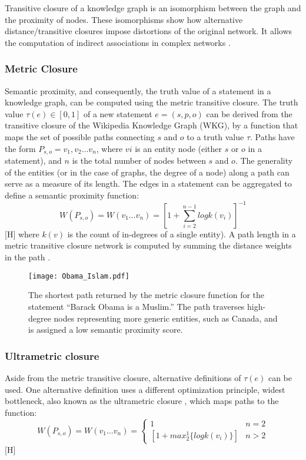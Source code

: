 \documentclass[10pt,11pt,12pt,oneside]{book}
\begin{document}
	Transitive closure of a knowledge graph is an isomorphism between the graph and the proximity of nodes. These isomorphisms show how alternative distance/transitive closures impose distortions of the original network. It allows the computation of indirect associations in complex networks \cite{SIMAS2015}.
	
	\subsubsection{Metric Closure}
	Semantic proximity, and consequently, the truth value of a statement in a knowledge graph, can be computed using the metric transitive closure. The truth value $\tau(e) \in [0, 1]$ of a new statement $e = (s, p, o)$ can be derived from the transitive closure of the Wikipedia Knowledge Graph (WKG), by a function that maps the set of possible paths connecting $s$ and $o$ to a truth value $\tau$. Paths have the form $P_{s,o} = v_{1}, v_{2}\ldots v_{n}$, where $vi$  is an entity node (either $s$ or $o$ in a statement), and $n$ is the total number of nodes between $s$ and $o$. The generality of the entities (or in the case of graphs, the degree of a node) along a path can serve as a measure of its length. The edges in a statement can be aggregated to define a semantic proximity function:
	$$
	W(P_{s,o}) = W(v_{1}\ldots v_{n}) = {[1 +  \sum_{i=2}^{n-1} log k(v_{i})]}^{-1}
	$$[H]
	where $k(v)$ is the count of in-degrees of a single entity). A path length in a metric transitive closure network is computed by summing the distance weights in the path \cite{SIMAS2015}.
	
	\begin{figure}[H]
		\begin{center}
			\texttt{[image: Obama\_Islam.pdf]}\\
			\label{fig_tc_obama}
			\caption{The shortest path returned by the metric closure function for the statement “Barack Obama is a Muslim.” The path traverses high-degree nodes representing more generic entities, such as Canada, and is assigned a low semantic proximity score. }
		\end{center}
	\end{figure}
	
	\subsubsection{Ultrametric closure}
	Aside from the metric transitive closure, alternative definitions of $\tau(e)$ can be used. One alternative definition uses a different optimization principle, widest bottleneck, also known as the ultrametric closure \cite{gruber1993translation}, which maps paths to the function:
	$$
	W(P_{s,o}) = W(v_{1}\ldots v_{n}) =\begin{cases}1 & n=2\\{[1+max^1_2 \{log k(v_{i})\}]} & n>2\end{cases} 
	$$[H]
	
\end{document}

